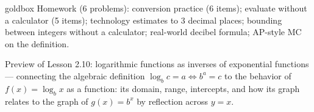 \documentclass[10pt]{article}
\begin{document}
\begin{skillbox}{goldbox}
Homework (6 problems): conversion practice (6 items); evaluate without a calculator (5 items);
technology estimates to 3 decimal places; bounding between integers without a calculator;
real-world decibel formula; AP-style MC on the definition.

Preview of Lesson 2.10: logarithmic functions as inverses of exponential functions ---
connecting the algebraic definition $\log_b c = a \Leftrightarrow b^a = c$ to the behavior
of $f(x) = \log_b x$ as a function: its domain, range, intercepts, and how its graph relates
to the graph of $g(x) = b^x$ by reflection across $y = x$.
\end{skillbox}
\end{document}
